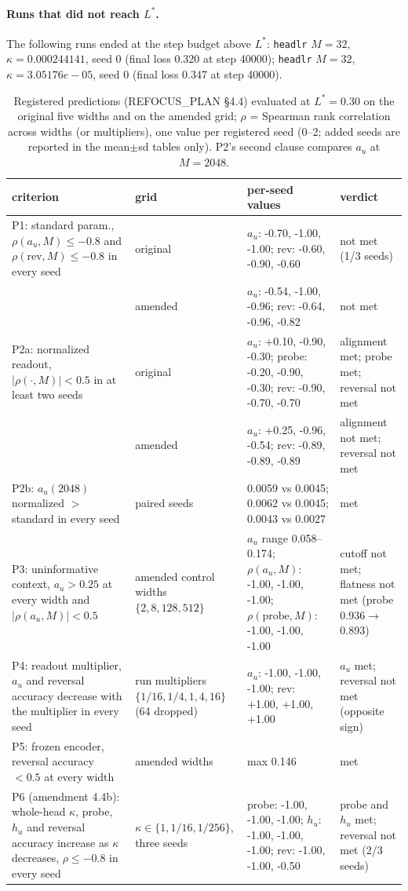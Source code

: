 \paragraph{Runs that did not reach $L^\ast$.}
The following runs ended at the step budget above $L^\ast$: \texttt{headlr} $M=32$, $\kappa=0.000244141$, seed 0 (final loss 0.320 at step 40000); \texttt{headlr} $M=32$, $\kappa=3.05176e-05$, seed 0 (final loss 0.347 at step 40000).
\begin{table}[htbp]\centering\scriptsize
\caption{Registered predictions (REFOCUS\_PLAN \S4.4) evaluated at $L^\ast=0.30$ on the original five widths and on the amended grid; $\rho$ = Spearman rank correlation across widths (or multipliers), one value per registered seed (0--2; added seeds are reported in the mean$\pm$sd tables only). P2's second clause compares $a_u$ at $M=2048$.}\label{tab:exp2_verdicts}
\begin{tabular}{p{4.6cm}p{2.6cm}p{3.8cm}p{2.0cm}}\toprule criterion & grid & per-seed values & verdict \\ \midrule
P1: standard param., $\rho(a_u,M)\le-0.8$ and $\rho(\text{rev},M)\le-0.8$ in every seed & original & $a_u$: -0.70, -1.00, -1.00; rev: -0.60, -0.90, -0.60 & not met (1/3 seeds) \\
 & amended & $a_u$: -0.54, -1.00, -0.96; rev: -0.64, -0.96, -0.82 & not met \\
P2a: normalized readout, $|\rho(\cdot,M)|<0.5$ in at least two seeds & original & $a_u$: +0.10, -0.90, -0.30; probe: -0.20, -0.90, -0.30; rev: -0.90, -0.70, -0.70 & alignment met; probe met; reversal not met \\
 & amended & $a_u$: +0.25, -0.96, -0.54; rev: -0.89, -0.89, -0.89 & alignment not met; reversal not met \\
P2b: $a_u(2048)$ normalized $>$ standard in every seed & paired seeds & 0.0059 vs 0.0045; 0.0062 vs 0.0045; 0.0043 vs 0.0027 & met \\
P3: uninformative context, $a_u>0.25$ at every width and $|\rho(a_u,M)|<0.5$ & amended control widths $\{2,8,128,512\}$ & $a_u$ range 0.058--0.174; $\rho(a_u,M)$: -1.00, -1.00, -1.00; $\rho(\text{probe},M)$: -1.00, -1.00, -1.00 & cutoff not met; flatness not met (probe 0.936$\to$0.893) \\
P4: readout multiplier, $a_u$ and reversal accuracy decrease with the multiplier in every seed & run multipliers $\{1/16,1/4,1,4,16\}$ (64 dropped) & $a_u$: -1.00, -1.00, -1.00; rev: +1.00, +1.00, +1.00 & $a_u$ met; reversal not met (opposite sign) \\
P5: frozen encoder, reversal accuracy $<0.5$ at every width & amended widths & max 0.146 & met \\
P6 (amendment 4.4b): whole-head $\kappa$, probe, $h_u$ and reversal accuracy increase as $\kappa$ decreases, $\rho\le-0.8$ in every seed & $\kappa\in\{1,1/16,1/256\}$, three seeds & probe: -1.00, -1.00, -1.00; $h_u$: -1.00, -1.00, -1.00; rev: -1.00, -1.00, -0.50 & probe and $h_u$ met; reversal not met (2/3 seeds) \\
\bottomrule\end{tabular}\end{table}
